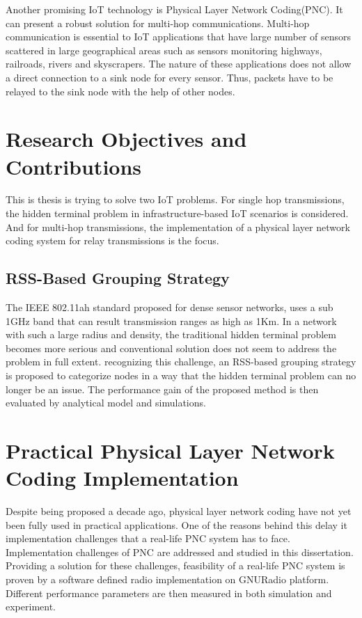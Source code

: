 Another promising IoT technology is Physical Layer Network Coding(PNC). It can present a robust solution for multi-hop communications. Multi-hop communication is essential to IoT applications that have large number of sensors scattered in large geographical areas such as sensors monitoring highways, railroads, rivers and skyscrapers. The nature of these applications does not allow a direct connection to a sink node for every sensor. Thus, packets have to be relayed to the sink node with the help of other nodes. 


\section{Research Objectives and Contributions}
This is thesis is trying to solve two IoT problems. For single hop transmissions, the hidden terminal problem in infrastructure-based IoT scenarios is considered. And for multi-hop transmissions, the implementation of a physical layer network coding system for relay transmissions is the focus.

\subsection{RSS-Based Grouping Strategy}
The IEEE 802.11ah standard proposed for dense sensor networks, uses a sub 1GHz band that can result transmission ranges as high as 1Km. In a network with such a large radius and density, the traditional hidden terminal problem becomes more serious and conventional solution does not seem to address the problem in full extent. recognizing this challenge, an RSS-based grouping strategy is proposed to categorize nodes in a way that the hidden terminal problem can no longer be an issue. The performance
gain of the proposed method is then evaluated by analytical model and simulations.


\section{Practical Physical Layer Network Coding Implementation}
Despite being proposed a decade ago, physical layer network coding have not yet been fully used in practical applications. One of the reasons behind this delay it implementation challenges that a real-life PNC system has to face. Implementation challenges of PNC are addressed and studied in this dissertation. Providing a solution for these challenges, feasibility of a real-life PNC system is proven by a software defined radio implementation on GNURadio platform. Different performance parameters are then measured in both simulation and experiment. 



